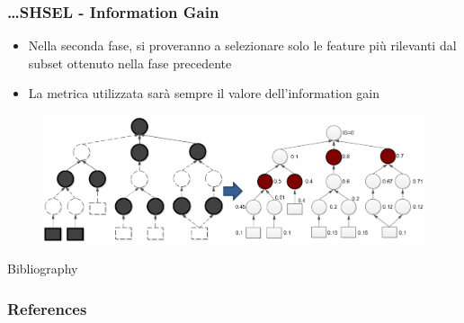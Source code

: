 \documentclass{beamer}
\begin{document}
\begin{frame}
	\frametitle{\dots SHSEL - Information Gain}
	\begin{itemize}
		\item Nella seconda fase, si proveranno a selezionare solo le feature più rilevanti dal subset ottenuto nella fase precedente
		\item La metrica utilizzata sarà sempre il valore dell'information gain
	\end{itemize}
	\begin{figure}[tbph]
		\centering
		\vspace{-0.2cm}
		\includegraphics[width=0.9\linewidth]{figure/Mannheim/SHSEL_Phase2.png}
		\label{fig:SHSELPhase2}
	\end{figure}
\end{frame}
\begin{frame}[allowframebreaks]{Bibliography}
	\frametitle{References}
	
	
\end{frame}
\end{document}
